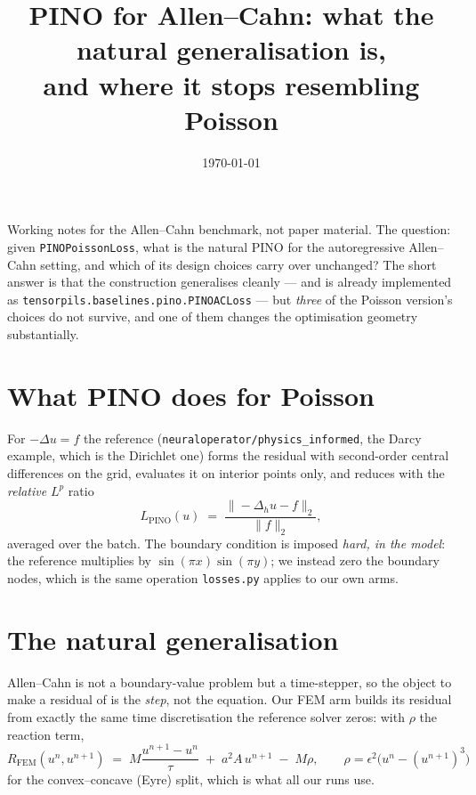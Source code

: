 \documentclass[11pt]{article}
\title{PINO for Allen--Cahn: what the natural generalisation is,\\ and where it stops resembling Poisson}
\date{\today}
\newcommand{\dt}{\tau}
\begin{document}
\maketitle

\noindent
Working notes for the Allen--Cahn benchmark, not paper material. The question: given
\texttt{PINOPoissonLoss}, what is the natural PINO for the autoregressive Allen--Cahn setting, and
which of its design choices carry over unchanged? The short answer is that the construction
generalises cleanly --- and is already implemented as
\texttt{tensorpils.baselines.pino.PINOACLoss} --- but \emph{three} of the Poisson version's
choices do not survive, and one of them changes the optimisation geometry substantially.

\section{What PINO does for Poisson}

For $-\Delta u = f$ the reference (\texttt{neuraloperator/physics\_informed}, the Darcy example,
which is the Dirichlet one) forms the residual with second-order central differences on the grid,
evaluates it on interior points only, and reduces with the \emph{relative} $L^p$ ratio
\begin{equation}
  L_{\mathrm{PINO}}(u) \;=\; \frac{\bigl\| -\Delta_h u - f \bigr\|_2}{\|f\|_2},
  \label{eq:poisson}
\end{equation}
averaged over the batch. The boundary condition is imposed \emph{hard, in the model}: the
reference multiplies by $\sin(\pi x)\sin(\pi y)$; we instead zero the boundary nodes, which is the
same operation \texttt{losses.py} applies to our own arms.

\section{The natural generalisation}

Allen--Cahn is not a boundary-value problem but a time-stepper, so the object to make a residual of
is the \emph{step}, not the equation. Our FEM arm builds its residual from exactly the same time
discretisation the reference solver zeros: with $\rho$ the reaction term,
\begin{equation}
  R_{\mathrm{FEM}}(u^{n},u^{n+1}) \;=\; M\frac{u^{n+1}-u^{n}}{\dt} \;+\; a^2 A\,u^{n+1} \;-\; M\rho ,
  \qquad
  \rho = \epsilon^2\bigl(u^{n} - (u^{n+1})^3\bigr)
  \label{eq:fem}
\end{equation}
for the convex--concave (Eyre) split, which is what all our runs use.
\end{document}
